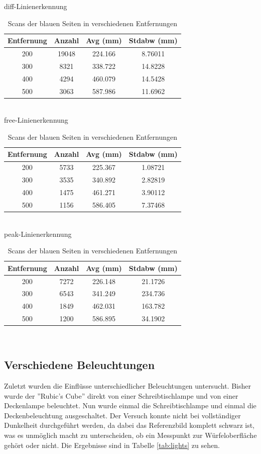 \documentclass[ngerman,a4paper,parskip=half]{scrartcl}
\begin{document}
\begin{table}[H]
	\centering
	diff-Linienerkennung \\
	\begin{tabular}{c|c|c|c}
		Entfernung & Anzahl & Avg (mm) & Stdabw (mm) \\ \hline
		200 & 19048 & 224.166 & 8.76011 \\
		300 & 8321 & 338.722 & 14.8228 \\
		400 & 4294 & 460.079 & 14.5428 \\
		500 & 3063 & 587.986 & 11.6962 \\
	\end{tabular} \\
	\vspace{1em}
	free-Linienerkennung \\
		\begin{tabular}{c|c|c|c}
		Entfernung & Anzahl & Avg (mm) & Stdabw (mm) \\ \hline
		200 & 5733 & 225.367 & 1.08721 \\
		300 & 3535 & 340.892 & 2.82819 \\
		400 & 1475 & 461.271 & 3.90112 \\
		500 & 1156 & 586.405 & 7.37468 \\
	\end{tabular} \\
	\vspace{1em}
	peak-Linienerkennung \\
		\begin{tabular}{c|c|c|c}
		Entfernung & Anzahl & Avg (mm) & Stdabw (mm) \\ \hline
		200 & 7272 & 226.148 & 21.1726 \\
		300 & 6543 & 341.249 & 234.736 \\
		400 & 1849 & 462.031 & 163.782 \\
		500 & 1200 & 586.895 & 34.1902 \\
	\end{tabular} \\
	\caption{Scans der blauen Seiten in verschiedenen Entfernungen}
	\label{tab:dists}
\end{table}

\subsection{Verschiedene Beleuchtungen}

Zuletzt wurden die Einflüsse unterschiedlicher Beleuchtungen untersucht. Bisher wurde der ''Rubic's Cube'' direkt von einer Schreibtischlampe und von einer Deckenlampe beleuchtet. Nun wurde einmal die Schreibtischlampe und einmal die Deckenbeleuchtung ausgeschaltet. Der Versuch konnte nicht bei vollständiger Dunkelheit durchgeführt werden, da dabei das Referenzbild komplett schwarz ist, was es unmöglich macht zu unterscheiden, ob ein Messpunkt zur Würfeloberfläche gehört oder nicht. Die Ergebnisse sind in Tabelle \ref{tab:lights} zu sehen.
\end{document}
